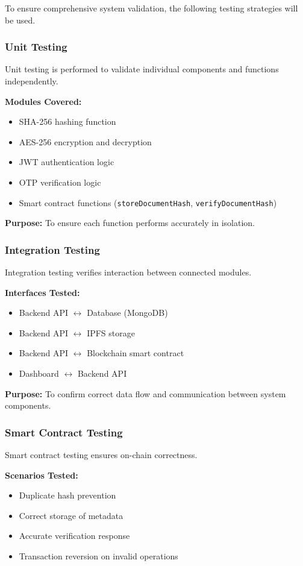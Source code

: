 \documentclass[12pt]{article}
\begin{document}
To ensure comprehensive system validation, the following testing strategies will be used.

\subsubsection{Unit Testing}

Unit testing is performed to validate individual components and functions independently.

\textbf{Modules Covered:}
\begin{itemize}
\item SHA-256 hashing function
\item AES-256 encryption and decryption
\item JWT authentication logic
\item OTP verification logic
\item Smart contract functions (\texttt{storeDocumentHash}, \texttt{verifyDocumentHash})
\end{itemize}

\textbf{Purpose:}  
To ensure each function performs accurately in isolation.

\subsubsection{Integration Testing}

Integration testing verifies interaction between connected modules.

\textbf{Interfaces Tested:}
\begin{itemize}
\item Backend API $\leftrightarrow$ Database (MongoDB)
\item Backend API $\leftrightarrow$ IPFS storage
\item Backend API $\leftrightarrow$ Blockchain smart contract
\item Dashboard $\leftrightarrow$ Backend API
\end{itemize}

\textbf{Purpose:}  
To confirm correct data flow and communication between system components.

\subsubsection{Smart Contract Testing}

Smart contract testing ensures on-chain correctness.

\textbf{Scenarios Tested:}
\begin{itemize}
\item Duplicate hash prevention
\item Correct storage of metadata
\item Accurate verification response
\item Transaction reversion on invalid operations
\end{itemize}
\end{document}
